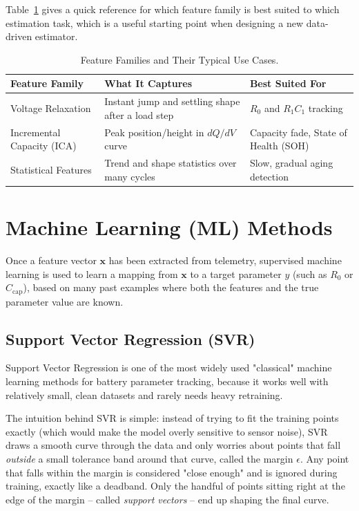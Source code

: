 Table~\ref{tab:ch8_feature_summary} gives a quick reference for which feature family is best suited to which estimation task, which is a useful starting point when designing a new data-driven estimator.

\begin{table}[htbp]
\centering
\caption{Feature Families and Their Typical Use Cases.}
\label{tab:ch8_feature_summary}
\renewcommand{\arraystretch}{1.3}
\footnotesize
\begin{tabularx}{\textwidth}{|p{2.6cm}|X|p{2.6cm}|}
\hline
\textbf{Feature Family} & \textbf{What It Captures} & \textbf{Best Suited For} \\
\hline
Voltage Relaxation & Instant jump and settling shape after a load step & $R_0$ and $R_1C_1$ tracking \\
\hline
Incremental Capacity (ICA) & Peak position/height in $dQ/dV$ curve & Capacity fade, State of Health (SOH) \\
\hline
Statistical Features & Trend and shape statistics over many cycles & Slow, gradual aging detection \\
\hline
\end{tabularx}
\end{table}


\section{Machine Learning (ML) Methods}
\label{sec:ml_methods}

Once a feature vector $\mathbf{x}$ has been extracted from telemetry, supervised machine learning is used to learn a mapping from $\mathbf{x}$ to a target parameter $y$ (such as $R_0$ or $C_{\text{cap}}$), based on many past examples where both the features and the true parameter value are known.

\subsection{Support Vector Regression (SVR)}
\label{subsec:svr_details}

Support Vector Regression is one of the most widely used "classical" machine learning methods for battery parameter tracking, because it works well with relatively small, clean datasets and rarely needs heavy retraining.

The intuition behind SVR is simple: instead of trying to fit the training points exactly (which would make the model overly sensitive to sensor noise), SVR draws a smooth curve through the data and only worries about points that fall \emph{outside} a small tolerance band around that curve, called the margin $\epsilon$. Any point that falls within the margin is considered "close enough" and is ignored during training, exactly like a deadband. Only the handful of points sitting right at the edge of the margin -- called \emph{support vectors} -- end up shaping the final curve.



